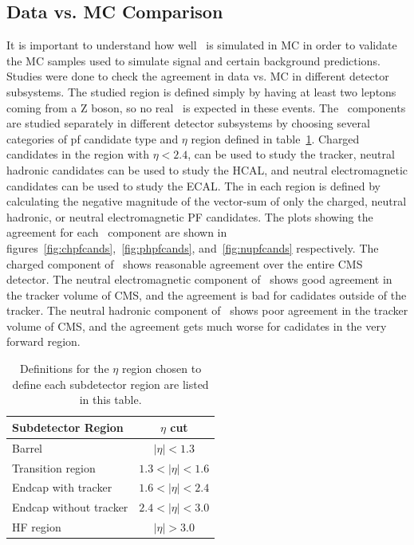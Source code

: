 \subsection{Data vs. MC Comparison}
\label{subs:MET_datavsmc}
It is important to understand how well \MET\ is simulated in MC in order to validate the MC samples used to simulate signal and certain background predictions.
Studies were done to check the agreement in data vs. MC in different detector subsystems.
The studied region is defined simply by having at least two leptons coming from a Z boson, so no real \MET\ is expected in these events.
The \MET\ components are studied separately in different detector subsystems by choosing several categories of pf candidate type and $\eta$ region defined in table~\ref{tab:subdetector_eta}.
Charged candidates in the region with $\eta < 2.4$, can be used to study the tracker,
neutral hadronic candidates can be used to study the HCAL,
and neutral electromagnetic candidates can be used to study the ECAL.
The \MET in each region is defined by calculating the negative magnitude of the vector-sum of only the charged, neutral hadronic, or neutral electromagnetic PF candidates.
The plots showing the agreement for each \MET\ component are shown in figures~\ref{fig:chpfcands},~\ref{fig:phpfcands}, and~\ref{fig:nupfcands} respectively. 
The charged  component of \MET\ shows reasonable agreement over the entire CMS detector.
The neutral electromagnetic component of \MET\ shows good agreement in the tracker volume of CMS, and the agreement is bad for cadidates outside of the tracker.
The neutral hadronic component of \MET\ shows poor agreement in the tracker volume of CMS, and the agreement gets much worse for cadidates in the very forward region.

\begin{table}[htb]
\scriptsize
\begin{center}
\caption{
Definitions for the $\eta$ region chosen to define each subdetector region are listed in this table.
\label{tab:subdetector_eta}}
\begin{tabular}{l|c}

\hline
Subdetector Region     & $\eta$ cut \\
\hline
Barrel                 & $|\eta| < 1.3$ \\
Transition region      & $1.3 < |\eta| < 1.6$ \\
Endcap with tracker    & $1.6 < |\eta| < 2.4$ \\
Endcap without tracker & $2.4 < |\eta| < 3.0$ \\
HF region              & $|\eta| > 3.0$ \\
\hline
\end{tabular}
\end{center}
\end{table}


